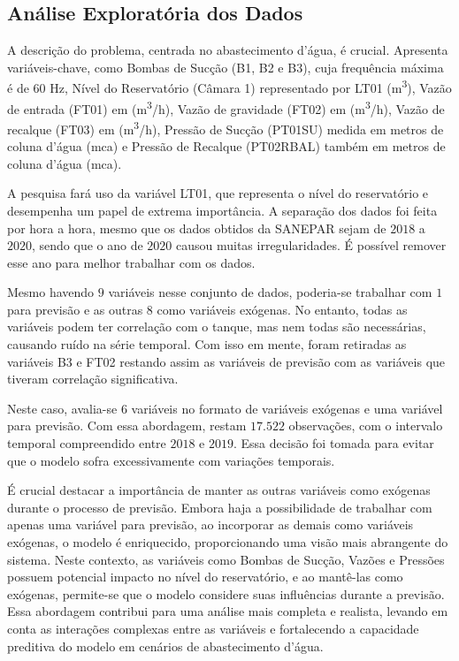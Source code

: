 \subsection{An\'alise Explorat\'oria dos Dados}


A descrição do problema, centrada no abastecimento d'água, é crucial. Apresenta variáveis-chave, como Bombas de Sucção (B1, B2 e B3), cuja frequência máxima é de $60$ Hz, Nível do Reservatório (Câmara 1) representado por LT01 (\si{m^3}), Vazão de entrada (FT01) em (\si{m^3/h}), Vazão de gravidade (FT02) em (\si{m^3/h}), Vazão de recalque (FT03) em (\si{m^3/h}), Pressão de Sucção (PT01SU) medida em metros de coluna d'água (\si{mca}) e Pressão de Recalque (PT02RBAL) também em metros de coluna d'água (\si{mca}).

A pesquisa fará uso da variável LT01, que representa o nível do reservatório e desempenha um papel de extrema importância. A separação dos dados foi feita por hora a hora, mesmo que os dados obtidos da SANEPAR sejam de $2018$ a $2020$, sendo que o ano de $2020$ causou muitas irregularidades. É possível remover esse ano para melhor trabalhar com os dados.

Mesmo havendo $9$ variáveis nesse conjunto de dados, poderia-se trabalhar com $1$ para previsão e as outras 8 como variáveis exógenas. No entanto, todas as variáveis podem ter correlação com o tanque, mas nem todas são necessárias, causando ruído na série temporal. Com isso em mente, foram retiradas as variáveis B3 e FT02 restando assim as variáveis de previsão com as variáveis que tiveram correlação significativa.

Neste caso, avalia-se 6 variáveis no formato de variáveis exógenas e uma variável para previsão. Com essa abordagem, restam $17.522$ observações, com o intervalo temporal compreendido entre $2018$ e $2019$. Essa decisão foi tomada para evitar que o modelo sofra excessivamente com variações temporais.

É crucial destacar a importância de manter as outras variáveis como exógenas durante o processo de previsão. Embora haja a possibilidade de trabalhar com apenas uma variável para previsão, ao incorporar as demais como variáveis exógenas, o modelo é enriquecido, proporcionando uma visão mais abrangente do sistema. Neste contexto, as variáveis como Bombas de Sucção, Vazões e Pressões possuem potencial impacto no nível do reservatório, e ao mantê-las como exógenas, permite-se que o modelo considere suas influências durante a previsão. Essa abordagem contribui para uma análise mais completa e realista, levando em conta as interações complexas entre as variáveis e fortalecendo a capacidade preditiva do modelo em cenários de abastecimento d'água.

